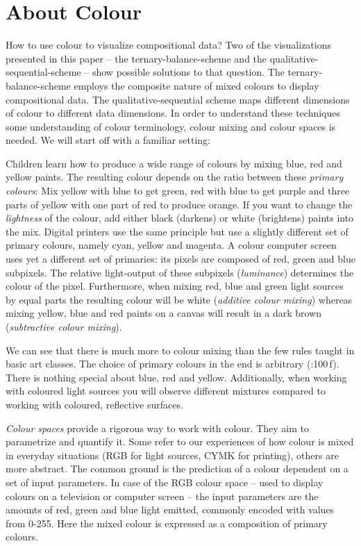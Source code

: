 \documentclass[a4paper]{scrartcl}
\begin{document}
\section*{About Colour}

How to use colour to visualize compositional data? Two of the visualizations presented in this paper -- the ternary-balance-scheme and the qualitative-sequential-scheme -- show possible solutions to that question. The ternary-balance-scheme employs the composite nature of mixed colours to display compositional data. The qualitative-sequential scheme maps different dimensions of colour to different data dimensions. In order to understand these techniques some understanding of colour terminology, colour mixing and colour spaces is needed. We will start off with a familiar setting:

Children learn how to produce a wide range of colours by mixing blue, red and yellow paints. The resulting colour depends on the ratio between these \emph{primary colours}: Mix yellow with blue to get green, red with blue to get purple and three parts of yellow with one part of red to produce orange. If you want to change the \emph{lightness} of the colour, add either black (darkens) or white (brightens) paints into the mix. Digital printers use the same principle but use a slightly different set of primary colours, namely cyan, yellow and magenta. A colour computer screen uses yet a different set of primaries: its pixels are composed of red, green and blue subpixels. The relative light-output of these subpixels (\emph{luminance}) determines the colour of the pixel. Furthermore, when mixing red, blue and green light sources by equal parts the resulting colour will be white (\emph{additive colour mixing}) whereas mixing yellow, blue and red paints on a canvas will result in a dark brown (\emph{subtractive colour mixing}).

We can see that there is much more to colour mixing than the few rules taught in basic art classes. The choice of primary colours in the end is arbitrary (\cite{Ware2013}:100\,f). There is nothing special about blue, red and yellow. Additionally, when working with coloured light sources you will observe different mixtures compared to working with coloured, reflective surfaces.

\emph{Colour spaces} provide a rigorous way to work with colour. They aim to parametrize and quantify it. Some refer to our experiences of how colour is mixed in everyday situations (RGB for light sources, CYMK for printing), others are more abstract. The common ground is the prediction of a colour dependent on a set of input parameters. In case of the RGB colour space -- used to display colours on a television or computer screen -- the input parameters are the amounts of red, green and blue light emitted, commonly encoded with values from 0-255. Here the mixed colour is expressed as a composition of primary colours.
\end{document}
